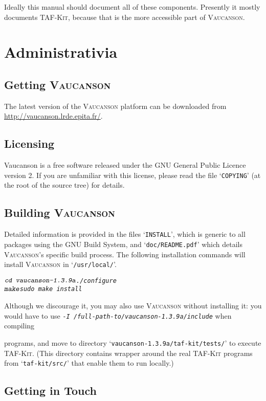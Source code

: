 \documentclass[a4paper]{report}
\makeatletter
\newcommand{\Cxx}{%
  \valign{\vfil\hbox{##}\vfil\cr
    {C\kern-.1em}\cr
    $\hbox{\fontsize\sf@size\z@\textbf{+\kern-0.05em+}}$\cr}%
    \xspace
}
\newenvironment{shell}
{\begin{alltt}}
{\end{alltt}}
\def\VcsnVersion{1.3.9a}
\newcommand\kbd[1]{\textsl{\texttt{#1}}}
\newcommand\file[1]{`\texttt{#1}'}
\newcommand{\tafkit}{\textsc{TAF-Kit}\xspace}
\newcommand{\Vauc}{\textsc{Vaucanson}\xspace}
\makeatother
\begin{document}
Ideally this manual should document all of these components.
Presently it mostly documents \tafkit, because that is the more
accessible part of \Vauc.


\chapter{Administrativia}

\section{Getting \Vauc}

The latest version of the \Vauc platform can be downloaded from
\url{http://vaucanson.lrde.epita.fr/}.

\section{Licensing}

Vaucanson is a free software released under the GNU General Public
Licence version 2. If you are unfamiliar with this license, please
read the file \file{COPYING} (at the root of the source tree) for
details.

\section{Building \Vauc}\label{sec:building}

Detailed information is provided in the files \file{INSTALL}, which is
generic to all packages using the GNU Build System, and
\file{doc/README.pdf} which details \Vauc's specific build process.
The following installation commands will install \Vauc in
\file{/usr/local/}.

\begin{shell}
$ \kbd{cd vaucanson-\VcsnVersion}
$ \kbd{./configure}
$ \kbd{make}
$ \kbd{sudo make install}
\end{shell}

Although we discourage it, you may also use \Vauc without installing
it: you would have to use \kbd{-I
  /full-path-to/vaucanson-\VcsnVersion/include} when compiling \Cxx
programs, and move to directory
\file{vaucanson-\VcsnVersion/taf-kit/tests/} to execute \tafkit.
(This directory contains wrapper around the real \tafkit programs from
\file{taf-kit/src/} that enable them to run locally.)

\section{Getting in Touch}
\end{document}
